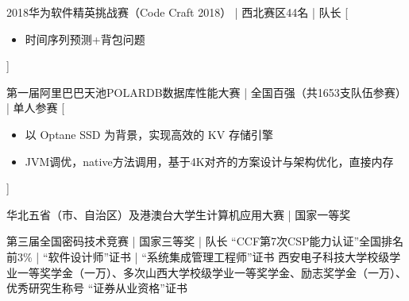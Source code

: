 \documentclass[zh]{resume}
\begin{document}
\begin{entries}

    {2018华为软件精英挑战赛（Code Craft 2018） | 西北赛区44名 | 队长}%
    [\begin{itemize}
      \item{\icon{\faFlag}} 时间序列预测+背包问题\quad {}
    \end{itemize}]%

    {第一届阿里巴巴天池POLARDB数据库性能大赛 | 全国百强（共1653支队伍参赛） | 单人参赛}%
    [\begin{itemize}
      \item{\icon{\faFlag}} 以 Optane SSD 为背景，实现高效的 KV 存储引擎
      \item{\icon{\faFlag}} JVM调优，native方法调用，基于4K对齐的方案设计与架构优化，直接内存
    \end{itemize}]%

    {华北五省（市、自治区）及港澳台大学生计算机应用大赛 | 国家一等奖 }%
	

    {第三届全国密码技术竞赛 | 国家三等奖 | 队长 \quad {}}%
    {“CCF第7次CSP能力认证”全国排名前3\% | “软件设计师”证书 | “系统集成管理工程师”证书}
    {西安电子科技大学校级学业一等奖学金（一万）、多次山西大学校级学业一等奖学金、励志奖学金（一万）、优秀研究生称号}
    {“证券从业资格”证书}
\end{entries}
\end{document}

